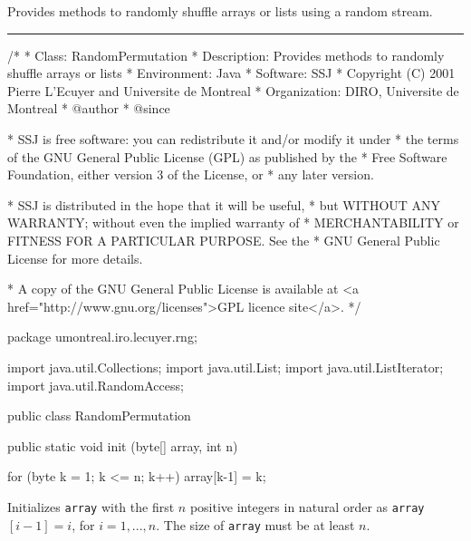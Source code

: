 
Provides methods to randomly shuffle arrays
or lists using a random stream.


\bigskip\hrule

\begin{code}
\begin{hide}
/*
 * Class:        RandomPermutation
 * Description:  Provides methods to randomly shuffle arrays or lists
 * Environment:  Java
 * Software:     SSJ 
 * Copyright (C) 2001  Pierre L'Ecuyer and Universite de Montreal
 * Organization: DIRO, Universite de Montreal
 * @author       
 * @since

 * SSJ is free software: you can redistribute it and/or modify it under
 * the terms of the GNU General Public License (GPL) as published by the
 * Free Software Foundation, either version 3 of the License, or
 * any later version.

 * SSJ is distributed in the hope that it will be useful,
 * but WITHOUT ANY WARRANTY; without even the implied warranty of
 * MERCHANTABILITY or FITNESS FOR A PARTICULAR PURPOSE.  See the
 * GNU General Public License for more details.

 * A copy of the GNU General Public License is available at
   <a href="http://www.gnu.org/licenses">GPL licence site</a>.
 */
\end{hide}
package umontreal.iro.lecuyer.rng;\begin{hide}

import java.util.Collections;
import java.util.List;
import java.util.ListIterator;
import java.util.RandomAccess;
\end{hide}

public class RandomPermutation\begin{hide} {
   private static final int SHUFFLE_THRESHOLD = 5;
\end{hide}

   public static void init (byte[] array, int n)\begin{hide} {
      for (byte k = 1; k <= n; k++)
         array[k-1] = k;
   }\end{hide}
\end{code}
\begin{tabb} Initializes \texttt{array} with the first $n$
  positive integers in natural order as \texttt{array}$[i-1] = i$, for
  $i=1,...,n$.  The size of \texttt{array} must be at least $n$.
\end{tabb}
\begin{htmlonly}
\end{htmlonly}
